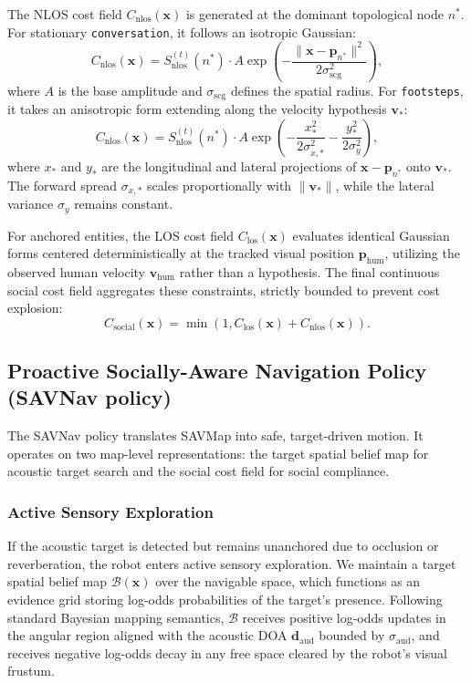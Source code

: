 The NLOS cost field $C_{\mathrm{nlos}}(\mathbf{x})$ is generated at the dominant topological node $n^*$. For stationary \texttt{conversation}, it follows an isotropic Gaussian:
\begin{equation}
    C_{\mathrm{nlos}}(\mathbf{x}) = S_{\mathrm{nlos}}^{(t)}(n^*) \cdot A \exp\left(-\frac{\|\mathbf{x} - \mathbf{p}_{n^*}\|^2}{2\sigma^2_{\mathrm{scg}}}\right),
    \label{eq:scg_cost}
\end{equation}
where $A$ is the base amplitude and $\sigma_{\mathrm{scg}}$ defines the spatial radius. For \texttt{footsteps}, it takes an anisotropic form extending along the velocity hypothesis $\mathbf{v}_{*}$:
\begin{equation}
    C_{\mathrm{nlos}}(\mathbf{x}) = S_{\mathrm{nlos}}^{(t)}(n^*) \cdot A \exp \left( - \frac{x_*^2}{2\sigma_{x,*}^2} - \frac{y_*^2}{2\sigma_y^2} \right),
    \label{eq:dp_cost}
\end{equation}
where $x_*$ and $y_*$ are the longitudinal and lateral projections of $\mathbf{x} - \mathbf{p}_{n^*}$ onto $\mathbf{v}_{*}$. The forward spread $\sigma_{x,*}$ scales proportionally with $\|\mathbf{v}_{*}\|$, while the lateral variance $\sigma_y$ remains constant.

For anchored entities, the LOS cost field $C_{\mathrm{los}}(\mathbf{x})$ evaluates identical Gaussian forms centered deterministically at the tracked visual position $\mathbf{p}_{\mathrm{hum}}$, utilizing the observed human velocity $\mathbf{v}_{\mathrm{hum}}$ rather than a hypothesis. The final continuous social cost field aggregates these constraints, strictly bounded to prevent cost explosion:
\begin{equation}
    C_{\mathrm{social}}(\mathbf{x}) = \min\left(1, C_{\mathrm{los}}(\mathbf{x}) + C_{\mathrm{nlos}}(\mathbf{x})\right).
    \label{eq:final_cost}
\end{equation}

\subsection{Proactive Socially-Aware Navigation Policy (SAVNav policy)}
\label{subsec:savnav}

The SAVNav policy translates SAVMap into safe, target-driven motion. It operates on two map-level representations: the target spatial belief map for acoustic target search and the social cost field for social compliance.

\subsubsection{Active Sensory Exploration}
If the acoustic target is detected but remains unanchored due to occlusion or reverberation, the robot enters active sensory exploration. We maintain a target spatial belief map $\mathcal{B}(\mathbf{x})$ over the navigable space, which functions as an evidence grid storing log-odds probabilities of the target's presence. Following standard Bayesian mapping semantics, $\mathcal{B}$ receives positive log-odds updates in the angular region aligned with the acoustic DOA $\mathbf{d}_{\mathrm{aud}}$ bounded by $\sigma_{\mathrm{aud}}$, and receives negative log-odds decay in any free space cleared by the robot's visual frustum.

